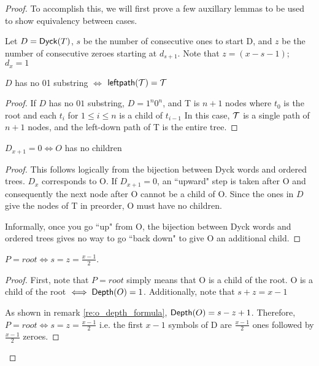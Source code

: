 \begin{proof}
To accomplish this, we will first prove a few auxillary lemmas to be used to show equivalency between cases. 

Let $D=\mathsf{Dyck}{(T)}$, $s$ be the number of consecutive ones to start D, and $z$ be the number of consecutive zeroes starting at $d_{s+1}$.  Note that $z=(x-s-1)$; $d_{x}=1$
\begin{lemma} \label{le:final_case_equivalence}

    $D$ has no 01 substring $\iff$ $\mathsf{leftpath}{(\mathcal{T})}=\mathcal{T}$
\end{lemma}
\begin{proof}


    If $D$ has no $01$ substring, $D=1^n0^n$, and T is $n+1$ nodes where $t_0$ is the root and each $t_i$ for $1\le i \le n$ is a child of $t_{i-1}$  In this case, $\mathcal{T}$ is a single path of $n+1$ nodes, and the left-down path of T is the entire tree.
\end{proof}
\begin{lemma} \label{le:no_children_equivalence}
    $D_{x+1} = 0 \iff O$ has no children
\end{lemma}
\begin{proof}

    This follows logically from the bijection between Dyck words and ordered trees.  $D_x$ corresponds to O.  If $D_{x+1}=0$, an ``upward" step is taken after O and consequently the next node after O cannot be a child of O.  Since the ones in $D$ give the nodes of T in preorder, O must have no children.

    Informally, once you go ``up" from O, the bijection between Dyck words and ordered trees gives no way to go ``back down" to give O an additional child.
\end{proof}
\begin{lemma} \label{le:tight_case_equivalence}
    $P=root \iff s=z=\frac{x-1}{2}$.
\end{lemma}
\begin{proof}

    First, note that $P=root$ simply means that O is a child of the root.  O is a child of the root $\iff \mathsf{Depth}{(O)}=1$.  Additionally, note that $s+z=x-1$

    As shown in remark \ref{re:o_depth_formula}, $\mathsf{Depth}{(O)}=s-z+1$. Therefore, $P=root \iff s=z=\frac{x-1}{2}$
    i.e. the first $x-1$ symbols of D are $\frac{x-1}{2}$ ones followed by $\frac{x-1}{2}$ zeroes. 



\end{proof}
\end{proof}
